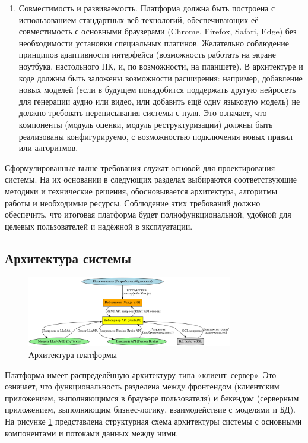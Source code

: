 \begin{enumerate}[label=\arabic*.]
    \item Совместимость и развиваемость. Платформа должна быть построена с использованием стандартных веб-технологий, обеспечивающих её совместимость с основными браузерами (Chrome, Firefox, Safari, Edge) без необходимости установки специальных плагинов. Желательно соблюдение принципов адаптивности интерфейса (возможность работать на экране ноутбука, настольного ПК, и, по возможности, на планшете). В архитектуре и коде должны быть заложены возможности расширения: например, добавление новых моделей (если в будущем понадобится поддержать другую нейросеть для генерации аудио или видео, или добавить ещё одну языковую модель) не должно требовать переписывания системы с нуля. Это означает, что компоненты (модуль оценки, модуль реструктуризации) должны быть реализованы конфигурируемо, с возможностью подключения новых правил или алгоритмов.
\end{enumerate}
Сформулированные выше требования служат основой для проектирования системы. На их основании в следующих разделах выбираются соответствующие методики и технические решения, обосновывается архитектура, алгоритмы работы и необходимые ресурсы. Соблюдение этих требований должно обеспечить, что итоговая платформа будет полнофункциональной, удобной для целевых пользователей и надёжной в эксплуатации.
\subsection{Архитектура системы}
\begin{figure}[htbp]
    \centering
    \includegraphics[width=0.8\textwidth]{picture/diploma-architecture.png}
    \caption{Архитектура платформы}
    \label{architecture}
\end{figure}
 Платформа имеет распределённую архитектуру типа «клиент–сервер». Это означает, что функциональность разделена между фронтендом (клиентским приложением, выполняющимся в браузере пользователя) и бекендом (серверным приложением, выполняющим бизнес-логику, взаимодействие с моделями и БД). На рисунке \ref{architecture} представлена структурная схема архитектуры системы с основными компонентами и потоками данных между ними.

